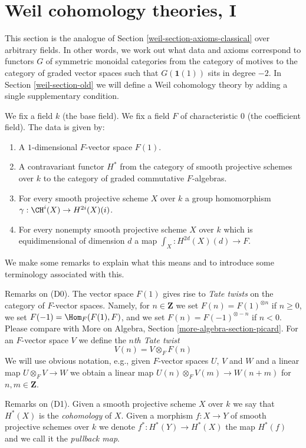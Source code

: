 \section{Weil cohomology theories, I}
\label{weil-section-axioms}
This section is the analogue of Section \ref{weil-section-axioms-classical}
over arbitrary fields. In other words, we work out what data and
axioms correspond to functors $G$ of symmetric monoidal categories from
the category of motives to the category of graded vector spaces such that
$G(\mathbf{1}(1))$ sits in degree $-2$. In Section \ref{weil-section-old}
we will define a Weil cohomology theory by adding a single supplementary
condition.

\medskip\noindent
We fix a field $k$ (the base field).
We fix a field $F$ of characteristic $0$ (the coefficient field).
The data is given by:
\begin{enumerate}
\item[(D0)] A $1$-dimensional $F$-vector space $F(1)$.
\item[(D1)] A contravariant functor $H^*$ from the category
of smooth projective schemes over $k$ to the category of
graded commutative $F$-algebras.
\item[(D2)] For every smooth projective scheme $X$ over $k$
a group homomorphism $\gamma : \CH^i(X) \to H^{2i}(X)(i)$.
\item[(D3)] For every nonempty smooth projective scheme $X$ over $k$
which is equidimensional of dimension $d$ a map
$\int_X : H^{2d}(X)(d) \to F$.
\end{enumerate}
We make some remarks to explain what this means and to introduce
some terminology associated with this.

\medskip\noindent
Remarks on (D0).
The vector space $F(1)$ gives rise to {\it Tate twists} on the category of
$F$-vector spaces. Namely, for $n \in \mathbf{Z}$ we set
$F(n) = F(1)^{\otimes n}$ if $n \geq 0$, we set $F(-1) = \Hom_F(F(1), F)$,
and we set $F(n) = F(-1)^{\otimes - n}$ if $n < 0$. Please compare
with More on Algebra, Section \ref{more-algebra-section-picard}.
For an $F$-vector space $V$ we define the {\it $n$th Tate twist}
$$
V(n) = V \otimes_F F(n)
$$
We will use obvious notation, e.g., given $F$-vector spaces $U$, $V$
and $W$ and a linear map $U \otimes_F V \to W$ we obtain a linear
map $U(n) \otimes_F V(m) \to W(n + m)$ for $n, m \in \mathbf{Z}$.

\medskip\noindent
Remarks on (D1).
Given a smooth projective scheme $X$ over $k$ we say that $H^*(X)$
is the {\it cohomology} of $X$. Given a morphism $f : X \to Y$
of smooth projective schemes over $k$ we denote $f^* : H^*(Y) \to H^*(X)$
the map $H^*(f)$ and we call it the {\it pullback map}.

